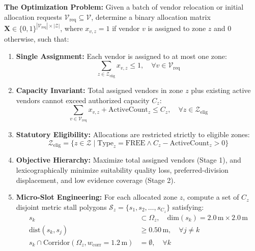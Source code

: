 \noindent \textbf{The Optimization Problem:} Given a batch of vendor relocation or initial allocation requests $\mathcal{V}_{\text{req}} \subseteq \mathcal{V}$, determine a binary allocation matrix $\mathbf{X} \in \{0, 1\}^{|\mathcal{V}_{\text{req}}| \times |\mathcal{Z}|}$, where $x_{v,z} = 1$ if vendor $v$ is assigned to zone $z$ and $0$ otherwise, such that:
\begin{enumerate}
    \item \textbf{Single Assignment:} Each vendor is assigned to at most one zone:
    \begin{equation}
        \sum_{z \in \mathcal{Z}_{\text{elig}}} x_{v,z} \le 1, \quad \forall v \in \mathcal{V}_{\text{req}}
        \label{eq:prob_single}
    \end{equation}
    \item \textbf{Capacity Invariant:} Total assigned vendors in zone $z$ plus existing active vendors cannot exceed authorized capacity $C_z$:
    \begin{equation}
        \sum_{v \in \mathcal{V}_{\text{req}}} x_{v,z} + \text{ActiveCount}_z \le C_z, \quad \forall z \in \mathcal{Z}_{\text{elig}}
        \label{eq:prob_capacity}
    \end{equation}
    \item \textbf{Statutory Eligibility:} Allocations are restricted strictly to eligible zones:
    \begin{equation}
        \mathcal{Z}_{\text{elig}} = \{z \in \mathcal{Z} \mid \text{Type}_z = \text{FREE} \land C_z - \text{ActiveCount}_z > 0\}
        \label{eq:prob_elig}
    \end{equation}
    \item \textbf{Objective Hierarchy:} Maximize total assigned vendors (Stage 1), and lexicographically minimize suitability quality loss, preferred-division displacement, and low evidence coverage (Stage 2).
    \item \textbf{Micro-Slot Engineering:} For each allocated zone $z$, compute a set of $C_z$ disjoint metric stall polygons $\mathcal{S}_z = \{s_1, s_2, \dots, s_{C_z}\}$ satisfying:
    \begin{align}
        s_k &\subset \Omega_z, \quad \text{dim}(s_k) = 2.0\,\text{m} \times 2.0\,\text{m} \\
        \text{dist}(s_k, s_j) &\ge 0.50\,\text{m}, \quad \forall j \ne k \\
        s_k \cap \text{Corridor}(\Omega_z, w_{\text{corr}} = 1.2\,\text{m}) &= \emptyset, \quad \forall k
    \end{align}
\end{enumerate}


